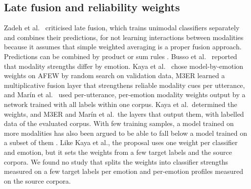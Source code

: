 \subsection{Late fusion and reliability weights}\label{sec:rel-fusion}
Zadeh et al.\ \cite{zadeh2017tfn} criticised late fusion, which trains unimodal classifiers separately and combines their predictions, for not learning interactions between modalities because it assumes that simple weighted averaging is a proper fusion approach. Predictions can be combined by product or sum rules \cite{kittler1998}. Busso et al.\ \cite{busso2004} reported that modality strengths differ by emotion. Kaya et al.\ \cite{kaya2017} chose model-by-emotion weights on AFEW by random search on validation data, M3ER \cite{mittal2020m3er} learned a multiplicative fusion layer that strengthens reliable modality cues per utterance, and Mar\'in et al.\ \cite{marin2026classwise} used per-utterance, per-emotion modality weights output by a network trained with all labels within one corpus. Kaya et al.\ determined the weights, and M3ER and Mar\'in et al.\ the layers that output them, with labelled data of the evaluated corpus. With few training samples, a model trained on more modalities has also been argued to be able to fall below a model trained on a subset of them \cite{huang2021}. Like Kaya et al., the proposal uses one weight per classifier and emotion, but it sets the weights from a few target labels and the source corpora. We found no study that splits the weights into classifier strengths measured on a few target labels per emotion and per-emotion profiles measured on the source corpora.
